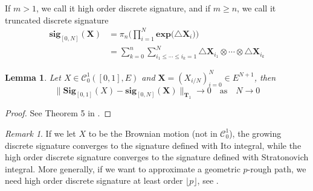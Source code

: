 \documentclass[12pt]{report}
\newtheorem{lemma}[theorem]{Lemma}
\theoremstyle{definition}
\theoremstyle{remark}
\newtheorem*{remark}{Remark}
\begin{document}
  If $m > 1$, we call it high order discrete signature, and if $m \geq n$, we call it truncated discrete signature
  \begin{equation}
    \begin{split}
      \mathbf{sig}_{[0,N]}(\mathbf{X}) &= \pi_{n}\bigg(\prod_{i=1}^{N}\mathbf{exp}\big(\triangle \mathbf{X}_{i}\big)\bigg)\\
      &= \sum_{k=0}^{n}\sum_{i_{1} \leq \cdots \leq i_{k} = 1}^{N} \triangle \mathbf{X}_{i_{1}} \otimes \cdots \otimes \triangle \mathbf{X}_{i_{k}} 
    \end{split}
  \end{equation} 
  \begin{lemma}
    Let $X \in \mathcal{C}^{1}_{0}([0,1],E)$ and $\mathbf{X} = (X_{i/N})_{i=0}^{N} \in E^{N+1}$, then
    \begin{equation}
      \lVert \mathbf{Sig}_{[0,1]}(X) - \mathbf{sig}_{[0,N]}(\mathbf{X})\rVert_{\mathbf{T}_{1}} \to 0\quad\text{as}\quad N \to 0
    \end{equation}
  \end{lemma}
  \begin{proof}
    See Theorem 5 in \cite{kiraly2019kernels}.
  \end{proof}
  \begin{remark}
    If we let $X$ to be the Brownian motion (not in $\mathcal{C}^{1}_{0}$), the growing discrete signature converges to the signature defined with Ito integral, while the high order discrete signature converges to the signature defined with Stratonovich integral. More generally, if we want to approximate a geometric $p$-rough path, we need high order discrete signature at least order $\lfloor p \rfloor$, see \cite{kiraly2019kernels}.
  \end{remark}
\end{document}
